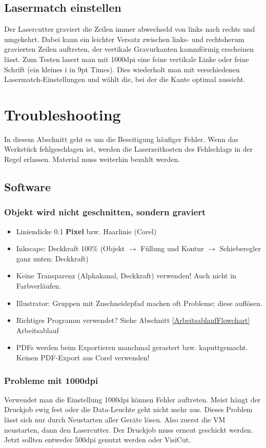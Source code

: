 \documentclass{\basedir/fablab-document}
\renewcommand{\todo}[1]{\textbf{\color{red}{TODO: #1}}}
\begin{document}
\subsection{Lasermatch einstellen}
Der Lasercutter graviert die Zeilen immer abwechseld von links nach rechts und umgekehrt. Dabei kann ein leichter Versatz zwischen links- und rechtsherum gravierten Zeilen auftreten, der vertikale Gravurkanten kammförmig erscheinen lässt. Zum Testen lasert man mit 1000dpi eine feine vertikale Linke oder feine Schrift (ein kleines i in 9pt Times). Dies wiederholt man mit verschiedenen Lasermatch-Einstellungen und wählt die, bei der die Kante optimal aussieht.

\todo{aus Aufzeichnungen übertragen}

\section{Troubleshooting}
In diesem Abschnitt geht es um die Beseitigung häufiger Fehler. Wenn das Werkstück fehlgeschlagen ist, werden die Laserzeitkosten des Fehlschlags in der Regel erlassen. Material muss weiterhin bezahlt werden.

\subsection{Software}
\subsubsection{Objekt wird nicht geschnitten, sondern graviert}
\begin{itemize}
 \item Liniendicke 0.1 \textbf{Pixel} bzw. Haarlinie (Corel)
 \item Inkscape: Deckkraft 100\% (Objekt $\rightarrow$ Füllung und Kontur $\rightarrow$ Schieberegler ganz unten: Deckkraft)
 \item Keine Transparenz (Alphakanal, Deckkraft) verwenden! Auch nicht in Farbverläufen.
 \item Illustrator: Gruppen mit Zuschneidepfad machen oft Probleme; diese auflösen.
 \item Richtiges Programm verwendet? Siehe Abschnitt \ref{ArbeitsablaufFlowchart} Arbeitsablauf
 \item PDFs werden beim Exportieren manchmal gerastert bzw. kaputtgemacht. Keinen PDF-Export aus Corel verwenden!
\end{itemize}


\subsubsection{Probleme mit 1000dpi}
Verwendet man die Einstellung 1000dpi können Fehler auftreten. Meist hängt der Druckjob ewig fest oder die Data-Leuchte geht nicht mehr aus. Dieses Problem lässt sich nur durch Neustarten aller Geräte lösen. Also zuerst die VM neustarten, dann den Lasercutter. Der Druckjob muss erneut geschickt werden. Jetzt sollten entweder 500dpi genutzt werden oder VisiCut.
\end{document}
